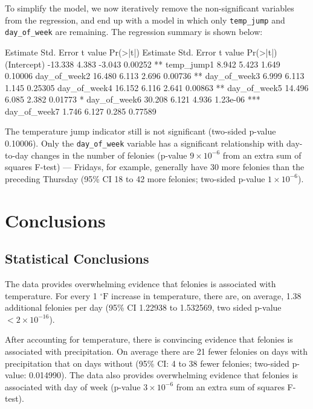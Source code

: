 \documentclass[11pt,notitlepage]{article}
\newenvironment{codeSmall}%
   {\par\noindent\adjustbox{margin=1ex,bgcolor=shadecolor,margin=0ex \medskipamount}\bgroup\minipage\linewidth\verbatim\footnotesize}%
   {\endverbatim\endminipage\egroup}
\newcommand{\degf}{^\circ\text{F}}
\begin{document}
To simplify the model, we now iteratively remove the non-significant variables from the regression, and end up with a model in which only \texttt{temp_jump} and \texttt{day_of_week} are remaining. The regression summary is shown below:

\begin{codeSmall}
             Estimate Std. Error t value Pr(>|t|)    
             Estimate Std. Error t value Pr(>|t|)    
(Intercept)   -13.338      4.383  -3.043  0.00252 ** 
temp_jump1      8.942      5.423   1.649  0.10006    
day_of_week2   16.480      6.113   2.696  0.00736 ** 
day_of_week3    6.999      6.113   1.145  0.25305    
day_of_week4   16.152      6.116   2.641  0.00863 ** 
day_of_week5   14.496      6.085   2.382  0.01773 *  
day_of_week6   30.208      6.121   4.936 1.23e-06 ***
day_of_week7    1.746      6.127   0.285  0.77589    
\end{codeSmall}


The temperature jump indicator still is not significant (two-sided p-value 0.10006). Only the \texttt{day_of_week} variable has a significant relationship with day-to-day changes in the number of felonies (p-value $9 \times 10^{-6}$ from an extra sum of squares F-test) --- Fridays, for example, generally have 30 more felonies than the preceding Thursday (95\% CI 18 to 42 more felonies; two-sided p-value $1 \times 10^{-6}$).


\section{Conclusions}
\label{sec:conclusion}

\subsection{Statistical Conclusions}

The data provides overwhelming evidence that felonies is associated with temperature. For every 1 $\degf$ increase in temperature, there are, on average, 1.38 additional felonies per day (95\% CI 1.22938 to 1.532569, two sided p-value $<2\times10^{-16}$).

After accounting for temperature, there is convincing evidence that felonies is associated with precipitation. On average there are 21 fewer felonies on days with precipitation that on days without (95\% CI: 4 to 38 fewer felonies; two-sided p-value: 0.014990). The data also provides overwhelming evidence that felonies is associated with day of week (p-value $3 \times 10^{-6}$ from an extra sum of squares F-test).
\end{document}
